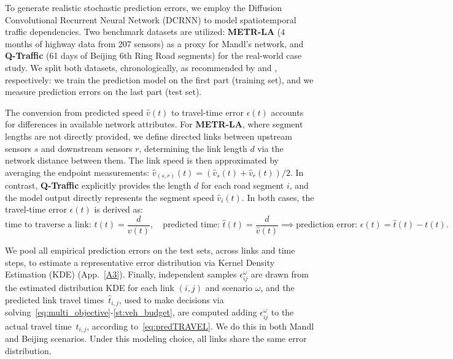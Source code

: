 \documentclass[a4paper,fleqn]{cas-sc}
\begin{document}
To generate realistic stochastic prediction errors, we employ the Diffusion Convolutional Recurrent Neural Network (DCRNN) \citep{li2017diffusion} to model spatiotemporal traffic dependencies. Two benchmark datasets are utilized: \textbf{METR-LA} (4 months of highway data from 207 sensors) as a proxy for Mandl’s network, and \textbf{Q-Traffic} (61 days of Beijing 6th Ring Road segments) for the real-world case study. We split both datasets, chronologically,  as recommended by \citet{li2017diffusion} and \citet{lu2022graph}, respectively: we train the prediction model on the first part (training set), and we measure prediction errors on the last part (test set).

The conversion from predicted speed $\hat{v}(t)$ to travel-time error $\epsilon(t)$ accounts for differences in available network attributes. For \textbf{METR-LA}, where segment lengths are not directly provided, we define directed links between upstream sensors $s$ and downstream sensors $r$, determining the link length $d$ via the network distance between them. The link speed is then approximated by averaging the endpoint measurements: $\hat{v}_{(s,r)}(t) = (\hat{v}_s(t) + \hat{v}_r(t))/2$. In contrast, \textbf{Q-Traffic} explicitly provides the length $d$ for each road segment $i$, and the model output directly represents the segment speed $\hat{v}_i(t)$. In both cases, the travel-time error $\epsilon(t)$ is derived as:
\[
    \text{time to traverse a link: }t(t) = \frac{d}{v(t)}, \quad \text{predicted time: }\hat{t}(t) = \frac{d}{\hat{v}(t)} \implies \text{prediction error: } \epsilon(t) = \hat{t}(t) - t(t).
\]

We pool all empirical prediction errors on the test sets, across links and time steps, to estimate a representative error distribution via Kernel Density Estimation (KDE) (App.~\ref{A3}). Finally, independent samples $\epsilon_{ij}^{\omega}$ are drawn from the estimated distribution KDE for each link $(i,j)$ and scenario $\omega$, and the predicted link travel times~$\hat t_{i,j}$, used to make decisions via solving~\eqref{eq:multi_objective}-\eqref{st:veh_budget}, are computed adding $\epsilon_{ij}^{\omega}$ to the actual travel time~$t_{i,j}$, according to~\eqref{eq:predTRAVEL}. We do this in both Mandl and Beijing scenarios.
Under this modeling choice, all links share the same error distribution.
\end{document}
